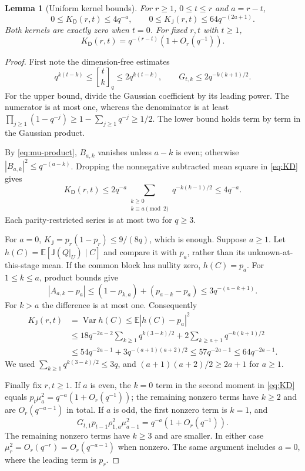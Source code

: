 \documentclass[11pt,a4paper]{article}
\newtheorem{lemma}[theorem]{Lemma}
\theoremstyle{definition}
\theoremstyle{remark}
\newcommand{\E}{\mathbb E}
\newcommand{\Var}{\operatorname{Var}}
\newcommand{\J}{\mathsf J}
\newcommand{\D}{\mathsf D}
\newcommand{\gb}[2]{\genfrac{[}{]}{0pt}{}{#1}{#2}_{q}}
\begin{document}
\begin{lemma}[Uniform kernel bounds]\label{lem:kernel-bounds}
For $r\ge1$, $0\le t\le r$ and $a=r-t$,
\begin{equation}\label{eq:kernel-bounds}
 0\le K_\D(r,t)\le4q^{-a},\qquad
 0\le K_\J(r,t)\le64q^{-(2a+1)}.
\end{equation}
Both kernels are exactly zero when $t=0$. For fixed $r,t$ with $t\ge1$,
\begin{equation}\label{eq:KD-asymptotic}
 K_\D(r,t)=q^{-(r-t)}(1+O_r(q^{-1})).
\end{equation}
\end{lemma}
\begin{proof}
First note the dimension-free estimates
\begin{equation}\label{eq:gaussian-bounds}
 q^{k(t-k)}\le\gb tk\le2q^{k(t-k)},\qquad
 G_{t,k}\le2q^{-k(k+1)/2}.
\end{equation}
For the upper bound, divide the Gaussian coefficient by its leading power.
The numerator is at most one, whereas the denominator is at least
$\prod_{j\ge1}(1-q^{-j})\ge1-\sum_{j\ge1}q^{-j}\ge1/2$.
The lower bound holds term by term in the Gaussian product.

By \eqref{eq:mu-product}, $B_{a,k}$ vanishes unless $a-k$ is even;
otherwise $|B_{a,k}|^2\le q^{-(a-k)}$. Dropping the nonnegative subtracted
mean square in \eqref{eq:KD} gives
\[
 K_\D(r,t)\le2q^{-a}
 \sum_{\substack{k\ge0\\ k\equiv a\pmod2}}q^{-k(k-1)/2}
 \le4q^{-a}.
\]
Each parity-restricted series is at most two for $q\ge3$.

For $a=0$, $K_\J=p_r(1-p_r)\le9/(8q)$, which is enough.
Suppose $a\ge1$. Let $h(C)=\E[\J(Q|_U)\mid C]$ and compare it with
$p_a$, rather than its unknown-at-this-stage mean. If the common block
has nullity zero, $h(C)=p_a$. For $1\le k\le a$, product bounds give
\[
 |A_{a,k}-p_a|
 \le (1-\rho_{k,a})+(p_{a-k}-p_a)
 \le3q^{-(a-k+1)}.
\]
For $k>a$ the difference is at most one. Consequently
\begin{align*}
 K_\J(r,t)&=\Var h(C)\le\E|h(C)-p_a|^2\\
 &\le18q^{-2a-2}\sum_{k\ge1}q^{k(3-k)/2}
       +2\sum_{k\ge a+1}q^{-k(k+1)/2}\\
 &\le54q^{-2a-1}+3q^{-(a+1)(a+2)/2}
 \le57q^{-2a-1}\le64q^{-2a-1}.
\end{align*}
We used $\sum_{k\ge1}q^{k(3-k)/2}\le3q$,
and $(a+1)(a+2)/2\ge2a+1$ for $a\ge1$.

Finally fix $r,t\ge1$. If $a$ is even, the $k=0$ term in the second
moment in \eqref{eq:KD} equals
$p_t\mu_a^2=q^{-a}(1+O_r(q^{-1}))$; the remaining nonzero terms have
$k\ge2$ and are $O_r(q^{-a-1})$ in total. If $a$ is odd, the first
nonzero term is $k=1$, and
\[
 G_{t,1}p_{t-1}\rho_{1,a}^2\mu_{a-1}^2
 =q^{-a}(1+O_r(q^{-1})).
\]
The remaining nonzero terms have $k\ge3$ and are smaller. In either case
$\mu_r^2=O_r(q^{-r})=O_r(q^{-a-1})$ when nonzero.
The same argument includes $a=0$, where the leading term is $p_r$.
\end{proof}
\end{document}
